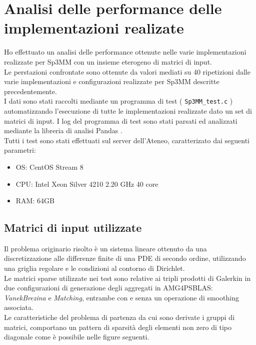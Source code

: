 \chapter{Analisi delle performance delle implementazioni realizate}
\label{ChPerf}

Ho effettuato un analisi delle performance ottenute nelle varie implementazioni 
realizzate per Sp3MM con un insieme eterogeno di matrici di input.\\
Le perstazioni confrontate sono ottenute da valori mediati su 40 ripetizioni
dalle varie implementazioni e configurazioni realizzate per Sp3MM descritte precedentemente.\\
I dati sono stati raccolti mediante un programma di test ( \verb|Sp3MM_test.c| ) automatizzando
l'esecuzione di tutte le implementazioni realizzate dato un set di matrici di input.
I log del programma di test sono stati parsati ed analizzati mediante la libreria di analisi Pandas \cite{pandasMan}.\\
Tutti i test sono stati effettuati sul server dell'Ateneo, caratterizato dai seguenti parametri:
\begin{itemize}
	\item	 OS:	CentOS Stream 8
	\item	CPU:	Intel Xeon Silver 4210 2.20 GHz 40 core
	\item	RAM:	64GB
\end{itemize}

\section{Matrici di input utilizzate}
Il problema originario risolto è un sistema lineare ottenuto da 
una discretizzazione alle differenze finite 
di una PDE di secondo ordine,
utilizzando una griglia regolare e le condizioni al contorno di Dirichlet.\\ %
Le matrici sparse utilizzate nei test
sono relative ai tripli prodotti di Galerkin in due configurazioni
di generazione degli aggregati in AMG4PSBLAS:
\emph{VanekBrezina} e \emph{Matching}, entrambe con e senza un operazione di smoothing associata.\\
Le caratteristiche del problema di partenza da cui sono derivate i gruppi di matrici,
comportano un pattern di sparsità degli elementi non zero di tipo diagonale 
come è possibile nelle figure seguenti.\\

